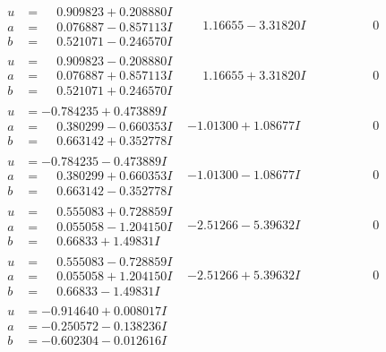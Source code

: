 \documentclass[1p]{elsarticle_modified}
\theoremstyle{definition}
\begin{document}
$$\begin{array}{c|c|c}
\begin{aligned}
u &= \phantom{-}0.909823 + 0.208880 I \\
a &= \phantom{-}0.076887 - 0.857113 I \\
b &= \phantom{-}0.521071 - 0.246570 I\end{aligned}
 & \phantom{-}1.16655 - 3.31820 I & \phantom{-0.000000 } 0 \\ \hline\begin{aligned}
u &= \phantom{-}0.909823 - 0.208880 I \\
a &= \phantom{-}0.076887 + 0.857113 I \\
b &= \phantom{-}0.521071 + 0.246570 I\end{aligned}
 & \phantom{-}1.16655 + 3.31820 I & \phantom{-0.000000 } 0 \\ \hline\begin{aligned}
u &= -0.784235 + 0.473889 I \\
a &= \phantom{-}0.380299 - 0.660353 I \\
b &= \phantom{-}0.663142 + 0.352778 I\end{aligned}
 & -1.01300 + 1.08677 I & \phantom{-0.000000 } 0 \\ \hline\begin{aligned}
u &= -0.784235 - 0.473889 I \\
a &= \phantom{-}0.380299 + 0.660353 I \\
b &= \phantom{-}0.663142 - 0.352778 I\end{aligned}
 & -1.01300 - 1.08677 I & \phantom{-0.000000 } 0 \\ \hline\begin{aligned}
u &= \phantom{-}0.555083 + 0.728859 I \\
a &= \phantom{-}0.055058 - 1.204150 I \\
b &= \phantom{-}0.66833 + 1.49831 I\end{aligned}
 & -2.51266 - 5.39632 I & \phantom{-0.000000 } 0 \\ \hline\begin{aligned}
u &= \phantom{-}0.555083 - 0.728859 I \\
a &= \phantom{-}0.055058 + 1.204150 I \\
b &= \phantom{-}0.66833 - 1.49831 I\end{aligned}
 & -2.51266 + 5.39632 I & \phantom{-0.000000 } 0 \\ \hline\begin{aligned}
u &= -0.914640 + 0.008017 I \\
a &= -0.250572 - 0.138236 I \\
b &= -0.602304 - 0.012616 I\end{aligned}

\end{array}$$
\end{document}

